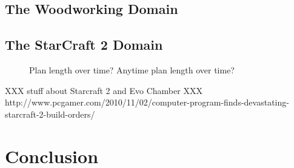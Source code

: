 \documentclass[letterpaper]{article}
\theoremstyle{plain} \newtheorem{theorem}{Theorem} \newtheorem{proposition}{Proposition} \newtheorem{lemma}{Lemma}
\theoremstyle{definition} \newtheorem{definition}{Definition} \newtheorem{conjecture}{Conjecture} \newtheorem*{example}{Example}
\theoremstyle{remark} \newtheorem*{remark}{Remark} \newtheorem*{note}{Note} \newtheorem{case}{Case}
\begin{document}
\subsection{The Woodworking Domain}
\subsection{The StarCraft 2 Domain}
\begin{figure}
  \caption{Plan length over time? Anytime plan length over time?}
\end{figure}

XXX stuff about Starcraft 2 and Evo Chamber
XXX http://www.pcgamer.com/2010/11/02/computer-program-finds-devastating-starcraft-2-build-orders/

\section{Conclusion}
\end{document}
